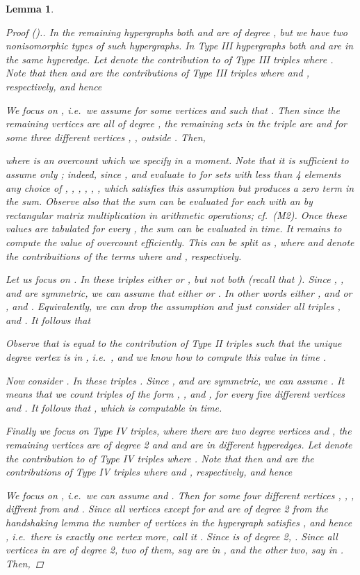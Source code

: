 \documentclass{amsart}
\newtheorem{Lem}{Lemma}
\begin{document}
\begin{Lem}
\begin{proof}[Proof ().]
In the remaining hypergraphs both  and  are of degree , but we have two nonisomorphic types of such hypergraphs.
In Type III hypergraphs both  and  are in the same hyperedge.
Let  denote the contribution to  of Type III triples where .
Note that then  and  are the contributions of Type III triples where  and , respectively, and hence 

We focus on , i.e.\ we assume  for some vertices  and  such that .
Then since the remaining vertices are all of degree , the remaining sets in the triple are  and  for some three different vertices , ,  outside . Then,


where  is an overcount which we specify in a moment.
Note that it is sufficient to assume only ; indeed, since ,  and  evaluate to  for sets with less than 4 elements any choice of , , , , , ,  which satisfies this assumption but  produces a zero term in the sum.
Observe also that the sum  can be evaluated for each  
with an  by  rectangular matrix multiplication
in  arithmetic operations; cf.~(M2).
Once these values are tabulated for every , the sum  can be evaluated in  time.
It remains to compute the value of overcount  efficiently.
This can be split as , where  and  denote the contribuitions of the terms where  and , respectively.

Let us focus on . In these triples either  or , but not both (recall that ).
Since , , and  are symmetric, we can assume that either  or .
In other words either ,  and  or ,  and .
Equivalently, we can drop the assumption  and just consider all triples ,  and . 
It follows that



Observe that  is equal to the contribution of Type II triples  such that the unique degree  vertex is in , i.e.\ 
, and we know how to compute this value in time .

Now consider . In these triples .
Since ,  and  are symmetric, we can assume .
It means that we count triples of the form , , and , for every five different vertices  and .
It follows that , which is computable in  time.

Finally we focus on Type IV triples, where there are two degree  vertices  and , the remaining vertices are of degree 2 and  and  are in different hyperedges. Let  denote the contribution to  of Type IV triples where .
Note that then  and  are the contributions of Type IV triples where  and , respectively, and hence 

We focus on , i.e.\ we can assume  and . 
Then  for some four different vertices , , ,  diffrent from  and . Since all vertices except for  and  are of degree 2 from the handshaking lemma the number of vertices  in the hypergraph satisfies , and hence , i.e.\ there is exactly one vertex more, call it .
Since  is of degree 2, . Since all vertices in  are of degree 2, two of them, say  are in , and the other two, say  in . Then,



\end{proof}
\end{Lem}
\end{document}
